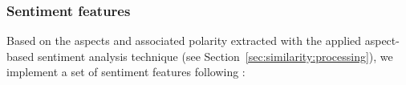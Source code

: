 
\subsubsection{Sentiment features} 

Based on the aspects and associated polarity extracted with the applied aspect-based sentiment analysis technique (see Section~\ref{sec:similarity:processing}), we implement a set of sentiment features following \cite{Suero2014}:

